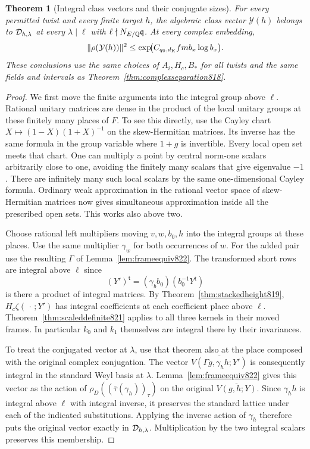 \documentclass[a4paper,11pt]{article}
\newtheorem{theorem}[proposition]{Theorem}
\theoremstyle{definition}
\theoremstyle{remark}
\numberwithin{equation}{section}
\begin{document}
\begin{theorem}[Integral class vectors and their conjugate sizes]
\leavevmode\label{thm:definiteclass822}
For every permitted twist and every finite target \(h\), the
algebraic class vector \(\mathcal Y(h)\) belongs to
\({\cal D}_{h,\lambda}\) at every \(\lambda\mid\ell\) with
\(\ell\nmid N_{E/\mathbb Q}\mathfrak q\). At every complex embedding,
\[
       \|\rho(\mathcal Y(h))\|^2
            \le \exp\!\bigl(C_{q_0,d_{\rm K}} f m b_x\log b_x\bigr).
\]
These conclusions use the same choices of \(A_i,H_c,B_*\)
for all twists and the same fields and intervals as
Theorem~\ref{thm:complexseparation818}.
\end{theorem}
\begin{proof}
We first move the finite arguments into the integral group
above \(\ell\). Rational unitary matrices are dense in the
product of the local unitary groups at these finitely many
places of \(F\). To see this directly, use the Cayley chart
\(X\mapsto (1-X)(1+X)^{-1}\) on the skew-Hermitian matrices.
Its inverse has the same formula in the group variable
where \(1+g\) is invertible. Every local open set meets
that chart. One can multiply a point by central norm-one
scalars arbitrarily close to one, avoiding the finitely many
scalars that give eigenvalue \(-1\). There are infinitely many
such local scalars by the same one-dimensional Cayley formula.
Ordinary weak approximation in the rational vector space of
skew-Hermitian matrices now gives simultaneous approximation
inside all the prescribed open sets. This works also above two.

Choose rational left multipliers moving \(v,w,b_0,h\)
into the integral groups at these places. Use the same
multiplier \(\gamma_w\) for both occurrences of \(w\).
For the added pair use the resulting \(\Gamma\) of
Lemma~\ref{lem:frameequiv822}. The transformed short rows
are integral above \(\ell\) since
\[
       (Y')^{\mathsf t}
          =(\gamma_b b_0)(b_0^{-1}Y^{\mathsf t})
\]
is there a product of integral matrices. By
Theorem~\ref{thm:stackedheight819}, \(H_c\zeta(\,\cdot\,;Y')\)
has integral coefficients at each coefficient place above
\(\ell\). Theorem~\ref{thm:scaleddefinite821} applies to all
three kernels in their moved frames. In particular \(k_0\) and
\(k_1\) themselves are integral there by their invariances.

To treat the conjugated vector at \(\lambda\), use that theorem
also at the place composed with the original complex conjugation.
The vector \(\overline{V(\Gamma g,\gamma_h h;Y')}\) is consequently
integral in the standard Weyl basis at \(\lambda\).
Lemma~\ref{lem:frameequiv822} gives this vector as the action
of \(\rho_D((\bar\tau(\gamma_h))_\tau)\) on the original
\(\overline{V(g,h;Y)}\). Since \(\gamma_h h\) is integral
above \(\ell\) with integral inverse, it preserves the
standard lattice under each of the indicated substitutions.
Applying the inverse action of \(\gamma_h\) therefore puts
the original vector exactly in \({\cal D}_{h,\lambda}\).
Multiplication by the two integral scalars preserves this
membership.


\end{proof}
\end{document}
